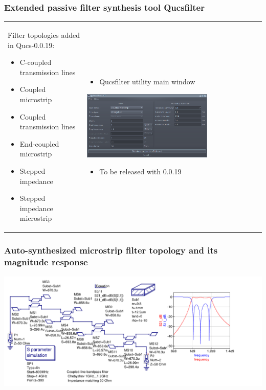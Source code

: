 \documentclass[9pt]{beamer}
\begin{document}
\begin{frame}
 \frametitle{Extended passive filter synthesis tool Qucsfilter}
 
 \begin{tabular}{p{}p{}}
  
  Filter topologies added in Qucs-0.0.19:
  
  \begin{itemize}
   \item C-coupled transmission lines
   \item Coupled microstrip
   \item Coupled transmission lines
   \item End-coupled microstrip
   \item Stepped impedance
   \item Stepped impedance microstrip
  \end{itemize}

  
  & \begin{itemize}
     \item Qucsfilter utility main window
    \end{itemize}
    
    \includegraphics[width=0.7\textwidth]{img/passivefilt.png}
    
    \begin{itemize}
     \item To be released with 0.0.19
    \end{itemize}

\\
 \end{tabular}
 
\end{frame}

\begin{frame}
 \frametitle{Auto-synthesized microstrip filter topology and its magnitude 
response}
 
 \includegraphics[width=1.1\textwidth]{img/msfilt.pdf}
\end{frame}
 
\end{document}
